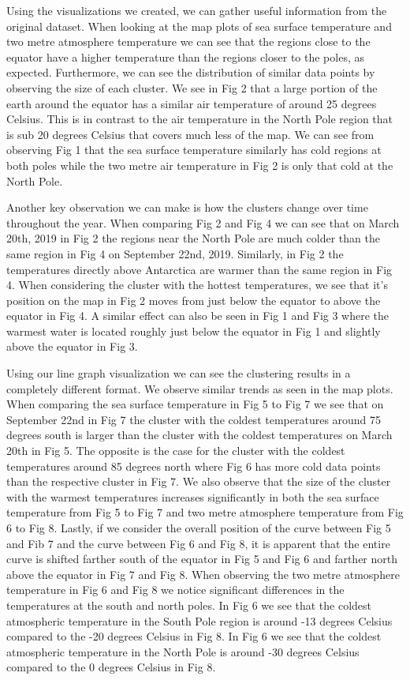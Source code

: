 \documentclass[conference,compsoc]{IEEEtran}
\begin{document}
Using the visualizations we created, we can gather useful information from the original dataset. When looking at the map plots of sea surface temperature and two metre atmosphere temperature we can see that the regions close to the equator have a higher temperature than the regions closer to the poles, as expected. Furthermore, we can see the distribution of similar data points by observing the size of each cluster. We see in Fig 2 that a large portion of the earth around the equator has a similar air temperature of around 25 degrees Celsius. This is in contrast to the air temperature in the North Pole region that is sub 20 degrees Celsius that covers much less of the map. We can see from observing Fig 1 that the sea surface temperature similarly has cold regions at both poles while the two metre air temperature in Fig 2 is only that cold at the North Pole.

Another key observation we can make is how the clusters change over time throughout the year. When comparing Fig 2 and Fig 4 we can see that on March 20th, 2019 in Fig 2 the regions near the North Pole are much colder than the same region in Fig 4 on September 22nd, 2019. Similarly, in Fig 2 the temperatures directly above Antarctica are warmer than the same region in Fig 4. When considering the cluster with the hottest temperatures, we see that it’s position on the map in Fig 2 moves from just below the equator to above the equator in Fig 4. A similar effect can also be seen in Fig 1 and Fig 3 where the warmest water is located roughly just below the equator in Fig 1 and slightly above the equator in Fig 3.

Using our line graph visualization we can see the clustering results in a completely different format. We observe similar trends as seen in the map plots. When comparing the sea surface temperature in Fig 5 to Fig 7 we see that on September 22nd in Fig 7 the cluster with the coldest temperatures around 75 degrees south is larger than the cluster with the coldest temperatures on March 20th in Fig 5. The opposite is the case for the cluster with the coldest temperatures around 85 degrees north where Fig 6 has more cold data points than the respective cluster in Fig 7. We also observe that the size of the cluster with the warmest temperatures increases significantly in both the sea surface temperature from Fig 5 to Fig 7 and two metre atmosphere temperature from Fig 6 to Fig 8. Lastly, if we consider the overall position of the curve between Fig 5 and Fib 7 and the curve between Fig 6 and Fig 8, it is apparent that the entire curve is shifted farther south of the equator in Fig 5 and Fig 6 and farther north above the equator in Fig 7 and Fig 8. When observing the two metre atmosphere temperature in Fig 6 and Fig 8 we notice significant differences in the temperatures at the south and north poles. In Fig 6 we see that the coldest atmospheric temperature in the South Pole region is around -13 degrees Celsius compared to the -20 degrees Celsius in Fig 8. In Fig 6 we see that the coldest atmospheric temperature in the North Pole is around -30 degrees Celsius compared to the 0 degrees Celsius in Fig 8.
\end{document}
